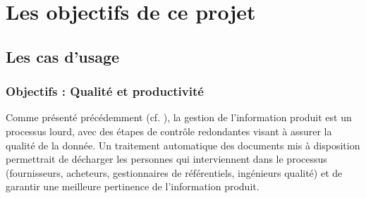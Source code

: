 \part{Les objectifs de ce projet}
    \chapter{Les cas d'usage}
        \section{Objectifs : Qualité et productivité}

        Comme présenté précédemment (cf. ), la gestion de l'information produit est un processus lourd, avec des étapes de contrôle redondantes visant à assurer la qualité de la donnée.
        Un traitement automatique des documents mis à disposition permettrait de décharger les personnes qui interviennent dans le processus (fournisseurs, acheteurs, gestionnaires de référentiels, ingénieurs qualité) et de garantir une meilleure pertinence de l'information produit.

